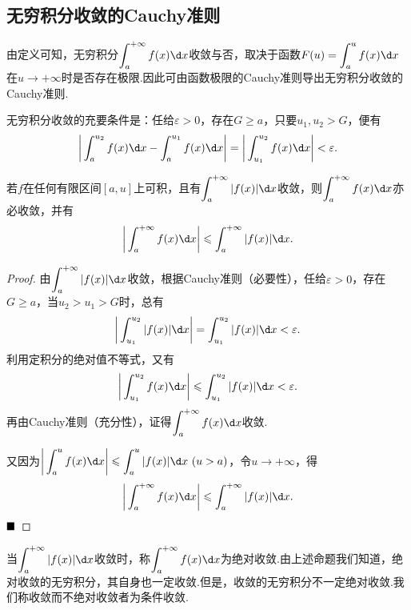 \subsection{无穷积分收敛的Cauchy准则}
由定义可知，无穷积分$\displaystyle\int_{a}^{+\infty}f(x)\d x$收敛与否，取决于函数$F(u)=\displaystyle\int_{a}^{u}f(x)\d x$在$u\to +\infty$时是否存在极限.因此可由函数极限的Cauchy准则导出无穷积分收敛的Cauchy准则.
\begin{theorem}[无穷积分收敛的Cauchy准则]
	无穷积分收敛的充要条件是：任给$\varepsilon>0$，存在$G\geqslant a$，只要$u_1,u_2>G$，便有
	$$\bigg|\int_{a}^{u_2}f(x)\d x-\int_{a}^{u_1}f(x)\d x\bigg|=\bigg|\int_{u_1}^{u_2}f(x)\d x\bigg|<\varepsilon.$$
\end{theorem}
\begin{proposition}
	若$f$在任何有限区间$\left[a,u\right]$上可积，且有$\displaystyle\int_{a}^{+\infty}|f(x)|\d x$收敛，则$\displaystyle\int_{a}^{+\infty}f(x)\d x$亦必收敛，并有
	$$\bigg|\int_{a}^{+\infty}f(x)\d x\bigg|\leqslant\int_{a}^{+\infty}|f(x)|\d x.$$
\end{proposition}
\begin{proof}
	由$\displaystyle\int_{a}^{+\infty}|f(x)|\d x$收敛，根据Cauchy准则（必要性），任给$\varepsilon>0$，存在$G\geqslant a$，当$u_2>u_1>G$时，总有
	$$\bigg|\int_{u_1}^{u_2}|f(x)|\d x\bigg|=\int_{u_1}^{u_2}|f(x)|\d x<\varepsilon.$$
	利用定积分的绝对值不等式，又有
	$$\bigg|\int_{u_1}^{u_2}f(x)\d x\bigg|\leqslant\int_{u_1}^{u_2}|f(x)|\d x<\varepsilon.$$
	再由Cauchy准则（充分性），证得$\displaystyle\int_{a}^{+\infty}f(x)\d x$收敛.
	
	又因为$\bigg|\displaystyle\int_{a}^{u}f(x)\d x\bigg|\leqslant\int_{a}^{u}|f(x)|\d x\ (u>a)$，令$u\to +\infty$，得
	$$\bigg|\int_{a}^{+\infty}f(x)\d x\bigg|\leqslant\int_{a}^{+\infty}|f(x)|\d x.$$
	$\hfill\blacksquare$
\end{proof}
\begin{remark}
	当$\displaystyle\int_{a}^{+\infty}|f(x)|\d x$收敛时，称$\displaystyle\int_{a}^{+\infty}f(x)\d x$为{\heiti 绝对收敛}.由上述命题我们知道，绝对收敛的无穷积分，其自身也一定收敛.但是，收敛的无穷积分不一定绝对收敛.我们称收敛而不绝对收敛者为{\heiti 条件收敛}.
\end{remark}
